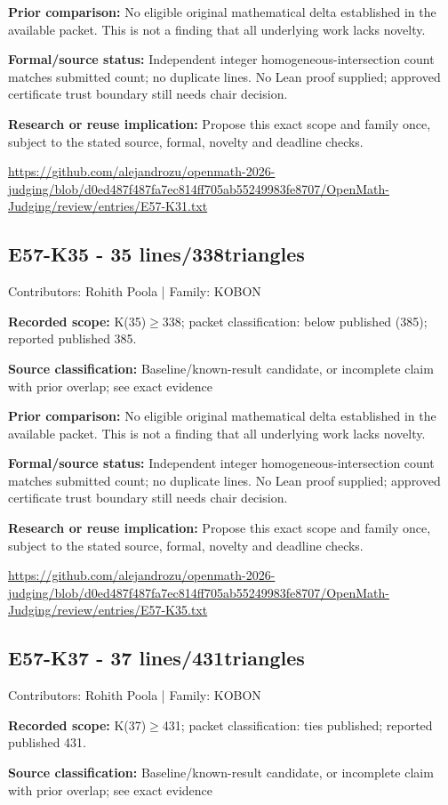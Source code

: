 \documentclass[11pt,a4paper]{article}
\begin{document}
\textbf{Prior comparison:} No eligible original mathematical delta established in the available packet. This is not a finding that all underlying work lacks novelty.

\textbf{Formal/source status:} Independent integer homogeneous-intersection count matches submitted count; no duplicate lines. No Lean proof supplied; approved certificate trust boundary still needs chair decision.

\textbf{Research or reuse implication:} Propose this exact scope and family once, subject to the stated source, formal, novelty and deadline checks.

{\small \url{https://github.com/alejandrozu/openmath-2026-judging/blob/d0ed487f487fa7ec814ff705ab55249983fe8707/OpenMath-Judging/review/entries/E57-K31.txt}\par}

\begin{samepage}
\subsection{E57-K35  -  35 lines/338triangles}
{\small Contributors: Rohith Poola | Family: KOBON\par}

\textbf{Recorded scope:} K(35)\ensuremath{\geq}338; packet classification: below published (385); reported published 385.

\end{samepage}
\textbf{Source classification:} Baseline/known-result candidate, or incomplete claim with prior overlap; see exact evidence

\textbf{Prior comparison:} No eligible original mathematical delta established in the available packet. This is not a finding that all underlying work lacks novelty.

\textbf{Formal/source status:} Independent integer homogeneous-intersection count matches submitted count; no duplicate lines. No Lean proof supplied; approved certificate trust boundary still needs chair decision.

\textbf{Research or reuse implication:} Propose this exact scope and family once, subject to the stated source, formal, novelty and deadline checks.

{\small \url{https://github.com/alejandrozu/openmath-2026-judging/blob/d0ed487f487fa7ec814ff705ab55249983fe8707/OpenMath-Judging/review/entries/E57-K35.txt}\par}

\begin{samepage}
\subsection{E57-K37  -  37 lines/431triangles}
{\small Contributors: Rohith Poola | Family: KOBON\par}

\textbf{Recorded scope:} K(37)\ensuremath{\geq}431; packet classification: ties published; reported published 431.

\end{samepage}
\textbf{Source classification:} Baseline/known-result candidate, or incomplete claim with prior overlap; see exact evidence
\end{document}
